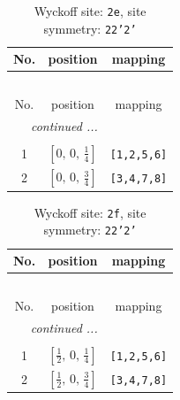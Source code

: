 \documentclass[fleqn,8pt]{jsarticle}
\begin{document}
\begin{longtable}{ccc}
\caption{Wyckoff site: {\tt 2e}, site symmetry: {\tt 22'2'}}
 \\
 \hline \hline
No. & position & mapping \\ \hline \endfirsthead

\multicolumn{2}{l}{\tablename\ \thetable{}} \\
 \hline \hline
No. & position & mapping \\ \hline \endhead

 \hline \hline
\multicolumn{2}{r}{\footnotesize\it continued ...} \\ \endfoot

 \hline \hline
\multicolumn{2}{r}{} \\ \endlastfoot

1 & $\left[ 0,\, 0,\, \frac{1}{4} \right]$ & {\tt [1,2,5,6]} \\ \hline
2 & $\left[ 0,\, 0,\, \frac{3}{4} \right]$ & {\tt [3,4,7,8]} \\
\end{longtable}
\renewcommand{\arraystretch}{1.2}
\begin{longtable}{ccc}
\caption{Wyckoff site: {\tt 2f}, site symmetry: {\tt 22'2'}}
 \\
 \hline \hline
No. & position & mapping \\ \hline \endfirsthead

\multicolumn{2}{l}{\tablename\ \thetable{}} \\
 \hline \hline
No. & position & mapping \\ \hline \endhead

 \hline \hline
\multicolumn{2}{r}{\footnotesize\it continued ...} \\ \endfoot

 \hline \hline
\multicolumn{2}{r}{} \\ \endlastfoot

1 & $\left[ \frac{1}{2},\, 0,\, \frac{1}{4} \right]$ & {\tt [1,2,5,6]} \\ \hline
2 & $\left[ \frac{1}{2},\, 0,\, \frac{3}{4} \right]$ & {\tt [3,4,7,8]} \\
\end{longtable}
\renewcommand{\arraystretch}{1.2}
\end{document}
